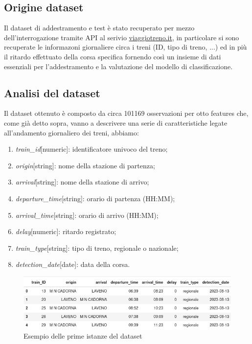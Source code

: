 \documentclass[italian,12pt,a4paper]{article}
\begin{document}
	\subsection{Origine dataset}
		Il dataset di addestramento e test è stato recuperato per mezzo dell'interrogazione tramite API al serivio 	\href{http://www.viaggiatreno.it/infomobilita/index.jsp}{viaggiotreno.it}, in particolare si sono recuperate le informazoni giornaliere circa i treni (ID, tipo di treno, ...) ed in più il ritardo effettuato della corsa specifica fornendo così un insieme di dati essenziali per l'addestramento e la valutazione del modello di classificazione.
		
	\subsection{Analisi del dataset}
		Il dataset ottenuto è composto da circa 101169 osservazioni per otto features che, come già detto sopra, vanno a descrivere una serie di caratteristiche legate all'andamento giornaliero dei treni, abbiamo:
		
		\begin{enumerate}
			\item \textit{train\_id}[numeric]: identificatore univoco del treno;
			\item \textit{origin}[string]: nome della stazione di partenza;
			\item \textit{arrival}[string]: nome della stazione di arrivo;
			\item \textit{departure\_time}[string]: orario di partenza (HH:MM);
			\item \textit{arrival\_time}[string]: orario di arrivo (HH:MM);
			\item \textit{delay}[numeric]: ritardo registrato;
			\item \textit{train\_type}[string]: tipo di treno, regionale o nazionale;
			\item \textit{detection\_date}[date]: data della corsa.
		\end{enumerate}
		
			\begin{figure}[!h]
				\centering
				\includegraphics[width=1.1\linewidth]{img/dataset}
				\caption{Esempio delle prime istanze del dataset}
			\end{figure}
	
\end{document}

